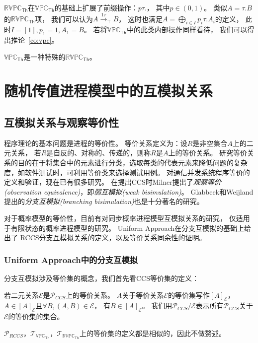 $\mathbb{RVPC}_{\mathsf{Th}}$在$\mathbb{VPC}_{\mathsf{Th}}$的基础上扩展了前缀操作：$p\tau.$，
其中$p\in (0,1)$。
类似$A=\tau.B$的$\mathbb{RVPC}_{\mathsf{Th}}$项，
我们可以认为$A\stackrel{1\tau}{\rightarrow}_{\top} B$，
这时也满足$A=\bigoplus_{i\in I} p_i\tau.A_i$的定义，
此时$I=[1],p_1=1,A_1=B$。
若将$\mathbb{VPC}_{\mathsf{Th}}$中的此类内部操作同样看待，
我们可以得出推论~\ref{co:vpc}。
\begin{corollary}\label{co:vpc}
   $\mathbb{VPC}_{\mathsf{Th}}$是一种特殊的$\mathbb{RVPC}_{\mathsf{Th}}$。
\end{corollary}

\section{随机传值进程模型中的互模拟关系}

\subsection{互模拟关系与观察等价性}\label{ch:bisimulation}

   程序理论的基本问题是进程的等价性。
   等价关系定义为：设$R$是非空集合$A$上的二元关系，
   若$R$是自反的、对称的、传递的，则称$R$是$A$上的等价关系。
   研究等价关系的目的在于将集合中的元素进行分类，选取每类的代表元素来降低问题的复杂度，如软件测试时，可利用等价类来选择测试用例。
   对通信并发系统程序等价的定义和验证，现在已有很多研究。
   在提出CCS时Milner提出了\textit{观察等价(observation equivalence)}，即\textit{弱互模拟(weak bisimulation)}\cite{2}。
   Glabbeek和Weijland提出的\textit{分支互模拟(branching bisimulation)}\cite{6}也是十分著名的研究。

   对于概率模型的等价性，目前有对同步概率进程模型互模拟关系的研究\cite{13}，
   仅适用于有限状态的概率进程模型的研究\cite{14,15}。
   Uniform Approach在分支互模拟\cite{6}的基础上给出了
   RCCS分支互模拟关系的定义，以及等价关系同余性的证明。
   \subsubsection{Uniform Approach中的分支互模拟}
   分支互模拟涉及等价集的概念，我们首先看CCS等价集的定义：
   \begin{definition}
      若二元关系$\mathcal{E}$是$\mathcal{P}_{CCS}$上的等价关系。
      $A$关于等价关系$\mathcal{E}$的等价集写作$[A]_{\mathcal{E}}$，
      $A\in [A]_{\mathcal{E}}$且$\forall B,(A,B)\in \mathcal{E}$，
      有$B\in [A]_{\mathcal{E}}$。
      我们用$\mathcal{P}_{CCS}/\mathcal{E}$表示所有$\mathcal{P}_{CCS}$关于$\mathcal{E}$的等价集的集合。
   \end{definition}
   $\mathcal{P}_{RCCS}$，$\mathcal{T}_{\mathbb{VPC}_{\mathsf{Th}}}$，$\mathcal{T}_{\mathbb{RVPC}_{\mathsf{Th}}}$上的等价集的定义都是相似的，因此不做赘述。


